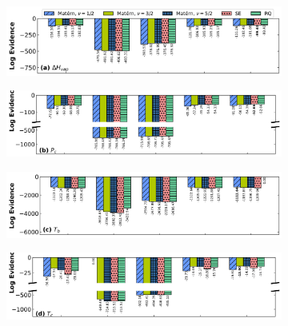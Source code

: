 \documentclass[journal=jacsat,manuscript=article]{achemso}
\begin{document}
\begin{figure}
     \centering
     \begin{subfigure}[b]{0.75\textwidth}
         \centering
         \includegraphics[width=\textwidth]{images/lml_bar_chart_Hvap_True.png}
     \end{subfigure}
     \hfill
     \begin{subfigure}[b]{0.75\textwidth}
         \centering
         \includegraphics[width=\textwidth]{images/lml_bar_chart_Pc_True.png}
     \end{subfigure}
     \hfill
     \begin{subfigure}[b]{0.75\textwidth}
         \centering
         \includegraphics[width=\textwidth]{images/lml_bar_chart_Tb_True.png}
     \end{subfigure}
     \hfill
     \begin{subfigure}[b]{0.75\textwidth}
         \centering
         \includegraphics[width=\textwidth]{images/lml_bar_chart_Tc_True.png}
     \end{subfigure}
     \hfill
     \begin{subfigure}[b]{0.75\textwidth}
         \centering

\end{subfigure}
\end{figure}
\end{document}
